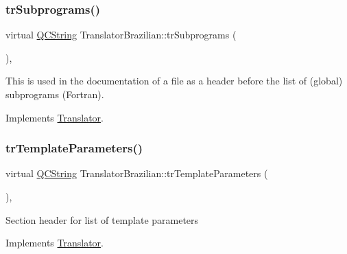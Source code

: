 \mbox{\label{class_translator_brazilian_a698f9070a4e6c770ce9f6c240785cc6f}} 
\subsubsection{\texorpdfstring{trSubprograms()}{trSubprograms()}}
{\footnotesize\ttfamily virtual \mbox{\hyperlink{class_q_c_string}{Q\+C\+String}} Translator\+Brazilian\+::tr\+Subprograms (\begin{DoxyParamCaption}{ }\end{DoxyParamCaption})\hspace{0.3cm}{\ttfamily [inline]}, {\ttfamily [virtual]}}

This is used in the documentation of a file as a header before the list of (global) subprograms (Fortran). 

Implements \mbox{\hyperlink{class_translator}{Translator}}.

\mbox{\label{class_translator_brazilian_a196d7b129a7ce773bb2ea409c2823f54}} 
\subsubsection{\texorpdfstring{trTemplateParameters()}{trTemplateParameters()}}
{\footnotesize\ttfamily virtual \mbox{\hyperlink{class_q_c_string}{Q\+C\+String}} Translator\+Brazilian\+::tr\+Template\+Parameters (\begin{DoxyParamCaption}{ }\end{DoxyParamCaption})\hspace{0.3cm}{\ttfamily [inline]}, {\ttfamily [virtual]}}

Section header for list of template parameters 

Implements \mbox{\hyperlink{class_translator}{Translator}}.

\mbox{\label{class_translator_brazilian_ae2f9ef85d57ffaff332182ca0152a437}} 
